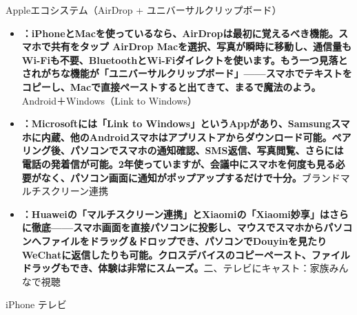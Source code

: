 


Appleエコシステム（AirDrop + ユニバーサルクリップボード）

\begin{itemize}
  \item \textbf{：iPhoneとMacを使っているなら、AirDropは最初に覚えるべき機能。スマホで共有をタップ AirDrop Macを選択、写真が瞬時に移動し、通信量もWi-Fiも不要、BluetoothとWi-Fiダイレクトを使います。もう一つ見落とされがちな機能が「ユニバーサルクリップボード」——スマホでテキストをコピーし、Macで直接ペーストすると出てきて、まるで魔法のよう。}Android＋Windows（Link to Windows）
  \item \textbf{：Microsoftには「Link to Windows」というAppがあり、Samsungスマホに内蔵、他のAndroidスマホはアプリストアからダウンロード可能。ペアリング後、パソコンでスマホの通知確認、SMS返信、写真閲覧、さらには電話の発着信が可能。2年使っていますが、会議中にスマホを何度も見る必要がなく、パソコン画面に通知がポップアップするだけで十分。}ブランドマルチスクリーン連携
  \item \textbf{：Huaweiの「マルチスクリーン連携」とXiaomiの「Xiaomi妙享」はさらに徹底——スマホ画面を直接パソコンに投影し、マウスでスマホからパソコンへファイルをドラッグ＆ドロップでき、パソコンでDouyinを見たりWeChatに返信したりも可能。クロスデバイスのコピーペースト、ファイルドラッグもでき、体験は非常にスムーズ。}二、テレビにキャスト：家族みんなで視聴
\end{itemize}


iPhone テレビ


